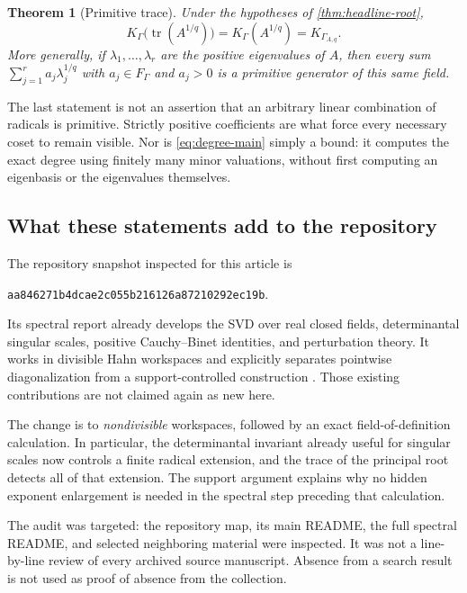 \documentclass[11pt,letterpaper]{article}
\numberwithin{equation}{section}
\newtheorem{theorem}{Theorem}[section]
\theoremstyle{definition}
\theoremstyle{remark}
\newcommand{\tr}{\operatorname{tr}}
\newcommand{\KG}{K_{\Gamma}}
\newcommand{\FG}{F_{\Gamma}}
\newcommand{\Commit}{\nolinkurl{aa846271b4dcae2c055b216126a87210292ec19b}}
\begin{document}
\begin{theorem}[Primitive trace]\label{thm:headline-trace}
Under the hypotheses of \cref{thm:headline-root},
\begin{equation}\label{eq:trace-main}
 \KG\bigl(\tr(A^{1/q})\bigr)=\KG(A^{1/q})=K_{\Gamma_{A,q}}.
\end{equation}
More generally, if $\lambda_1,\ldots,\lambda_r$ are the positive eigenvalues
of $A$, then every sum $\sum_{j=1}^{r}a_j\lambda_j^{1/q}$ with
$a_j\in\FG$ and $a_j>0$ is a primitive generator of this same field.
\end{theorem}

The last statement is not an assertion that an arbitrary linear combination
of radicals is primitive. Strictly positive coefficients are what force every
necessary coset to remain visible. Nor is \cref{eq:degree-main} simply a bound:
it computes the exact degree using finitely many minor valuations, without
first computing an eigenbasis or the eigenvalues themselves.

\subsection{What these statements add to the repository}

The repository snapshot inspected for this article is
\begin{center}\small\Commit.\end{center}
Its spectral report already develops the SVD over real closed fields,
determinantal singular scales, positive Cauchy--Binet identities, and
perturbation theory. It works in divisible Hahn workspaces and explicitly
separates pointwise diagonalization from a support-controlled construction
\cite{RepoSpectral}. Those existing contributions are not claimed again as
new here.

The change is to \emph{nondivisible} workspaces, followed by an exact
field-of-definition calculation. In particular, the determinantal invariant
already useful for singular scales now controls a finite radical extension,
and the trace of the principal root detects all of that extension. The
support argument explains why no hidden exponent enlargement is needed in
the spectral step preceding that calculation.

The audit was targeted: the repository map, its main README, the full spectral
README, and selected neighboring material were inspected. It was not a
line-by-line review of every archived source manuscript. Absence from a search
result is not used as proof of absence from the collection.
\end{document}
